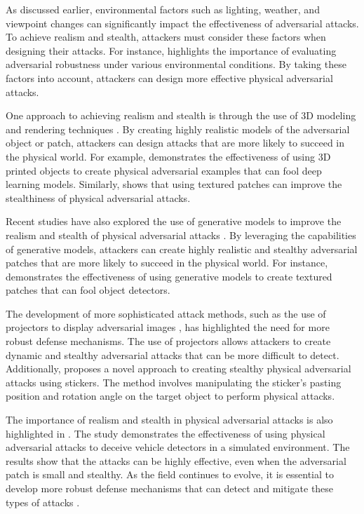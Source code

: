 \documentclass[11pt,a4paper]{article}
\begin{document}
As discussed earlier, environmental factors such as lighting, weather, and viewpoint changes can significantly impact the effectiveness of adversarial attacks. To achieve realism and stealth, attackers must consider these factors when designing their attacks. For instance, \cite{arxiv:1902.06705} highlights the importance of evaluating adversarial robustness under various environmental conditions. By taking these factors into account, attackers can design more effective physical adversarial attacks. 

One approach to achieving realism and stealth is through the use of 3D modeling and rendering techniques \cite{doi:10.1109/cvpr52688.2022.01487}. By creating highly realistic models of the adversarial object or patch, attackers can design attacks that are more likely to succeed in the physical world. For example, \cite{arxiv:1707.08945} demonstrates the effectiveness of using 3D printed objects to create physical adversarial examples that can fool deep learning models. Similarly, \cite{arxiv:1806.02299} shows that using textured patches can improve the stealthiness of physical adversarial attacks.

Recent studies have also explored the use of generative models to improve the realism and stealth of physical adversarial attacks \cite{doi:10.1109/cvpr46437.2021.01167}. By leveraging the capabilities of generative models, attackers can create highly realistic and stealthy adversarial patches that are more likely to succeed in the physical world. For instance, \cite{doi:10.1007/978-3-030-58574-7_41} demonstrates the effectiveness of using generative models to create textured patches that can fool object detectors.

The development of more sophisticated attack methods, such as the use of projectors to display adversarial images \cite{doi:10.1109/vr51125.2022.00073}, has highlighted the need for more robust defense mechanisms. The use of projectors allows attackers to create dynamic and stealthy adversarial attacks that can be more difficult to detect. Additionally, \cite{doi:10.1109/tpami.2022.3176760} proposes a novel approach to creating stealthy physical adversarial attacks using stickers. The method involves manipulating the sticker's pasting position and rotation angle on the target object to perform physical attacks.

The importance of realism and stealth in physical adversarial attacks is also highlighted in \cite{arxiv:2007.16118}. The study demonstrates the effectiveness of using physical adversarial attacks to deceive vehicle detectors in a simulated environment. The results show that the attacks can be highly effective, even when the adversarial patch is small and stealthy. As the field continues to evolve, it is essential to develop more robust defense mechanisms that can detect and mitigate these types of attacks \cite{arxiv:1810.00069}.
\end{document}
